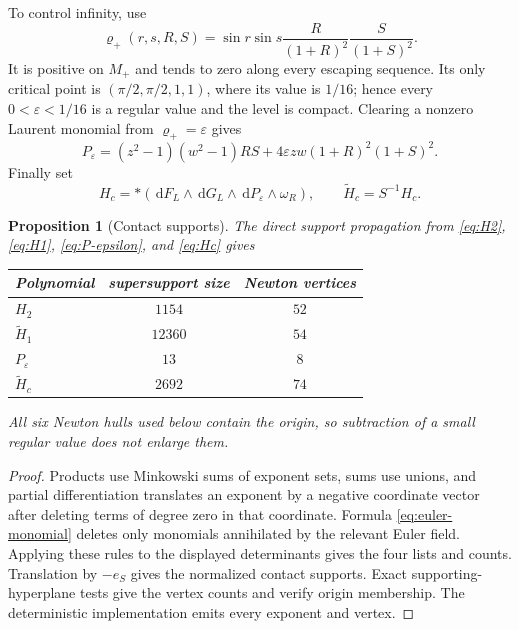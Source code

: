 \documentclass[11pt]{article}
\newtheorem{proposition}[theorem]{Proposition}
\newcommand{\dd}{\,\mathrm d}
\begin{document}
To control infinity, use
\begin{equation}\label{eq:covering}
 \varrho_+(r,s,R,S)=\sin r\sin s
 \frac{R}{(1+R)^2}\frac{S}{(1+S)^2}.
\end{equation}
It is positive on $M_+$ and tends to zero along every escaping sequence.  Its only critical point is $(\pi/2,\pi/2,1,1)$, where its value is $1/16$; hence every $0<\varepsilon<1/16$ is a regular value and the level is compact.  Clearing a nonzero Laurent monomial from $\varrho_+=\varepsilon$ gives
\begin{equation}\label{eq:P-epsilon}
 P_\varepsilon=(z^2-1)(w^2-1)RS
 +4\varepsilon zw(1+R)^2(1+S)^2.
\end{equation}
Finally set
\begin{equation}\label{eq:Hc}
 H_c=*(\dd F_L\wedge\dd G_L\wedge\dd P_\varepsilon\wedge\omega_R),
 \qquad \widetilde H_c=S^{-1}H_c.
\end{equation}

\begin{proposition}[Contact supports]\label{prop:contact-supports}
The direct support propagation from \eqref{eq:H2}, \eqref{eq:H1}, \eqref{eq:P-epsilon}, and \eqref{eq:Hc} gives
\begin{center}
\begin{tabular}{@{}lcc@{}}
\toprule
Polynomial & supersupport size & Newton vertices\\
\midrule
$H_2$ & $1154$ & $52$\\
$\widetilde H_1$ & $12360$ & $54$\\
$P_\varepsilon$ & $13$ & $8$\\
$\widetilde H_c$ & $2692$ & $74$\\
\bottomrule
\end{tabular}
\end{center}
All six Newton hulls used below contain the origin, so subtraction of a small regular value does not enlarge them.
\end{proposition}

\begin{proof}
Products use Minkowski sums of exponent sets, sums use unions, and partial differentiation translates an exponent by a negative coordinate vector after deleting terms of degree zero in that coordinate.  Formula \eqref{eq:euler-monomial} deletes only monomials annihilated by the relevant Euler field.  Applying these rules to the displayed determinants gives the four lists and counts.  Translation by $-e_S$ gives the normalized contact supports.  Exact supporting-hyperplane tests give the vertex counts and verify origin membership.  The deterministic implementation emits every exponent and vertex.
\end{proof}
\end{document}

